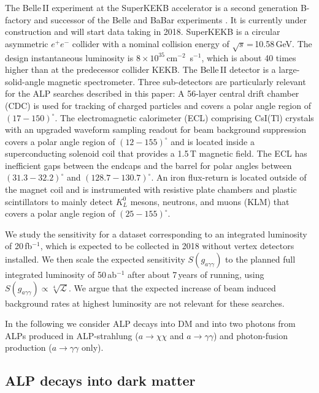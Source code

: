 \documentclass[11pt,a4paper]{article}
\newcommand{\ga}{g_{a\gamma\gamma}}
\def \belletwo {Belle\,II\xspace}
\def \belle {Belle\xspace}
\def \babar {BaBar\xspace}
\def \superkekb {SuperKEKB\xspace}
\begin{document}
The \belletwo experiment at the SuperKEKB accelerator is a second generation \hbox{B-factory} and successor of the \belle and \babar experiments \cite{Abe:2010gxa}. It is currently under construction and will start data taking in 2018. \superkekb is a circular asymmetric $e^+e^-$ collider with a nominal collision energy of $\sqrt{s}$\,=\,10.58\,GeV. The design instantaneous luminosity is \hbox{$8\times10^{35}$\,cm$^{-2}$ s$^{-1}$}, which is about 40 times higher than at the predecessor collider KEKB. The \belletwo detector is a large-solid-angle magnetic spectrometer. Three  sub-detectors are particularly relevant for the ALP searches described in this paper: A 56-layer central drift chamber (CDC) is used for tracking of charged particles and covers a polar angle region of $(17-150)^{\circ}$. The electromagnetic calorimeter (ECL) comprising CsI(Tl) crystals with an upgraded waveform sampling readout for beam background suppression covers a polar angle region of $(12-155)^{\circ}$ and is located inside a superconducting solenoid coil that provides a 1.5\,T magnetic field. The ECL has inefficient gaps between the endcaps and the barrel for polar angles between $(31.3-32.2)^{\circ}$ and $(128.7-130.7)^{\circ}$. An iron flux-return is located outside of the magnet coil and is instrumented with resistive plate chambers and plastic scintillators to mainly detect $K^0_L$ mesons, neutrons, and muons (KLM) that covers a polar angle region of $(25-155)^{\circ}$.

We study the sensitivity for a dataset corresponding to an integrated luminosity of 20\,fb$^{-1}$, which is expected to be collected in 2018 without vertex detectors installed. We then scale the expected sensitivity $S(\ga)$  to the planned full integrated luminosity of 50\,ab$^{-1}$ after about 7\,years of running, using $S(\ga) \propto \sqrt[4]{\mathcal{L}}$. We argue that the expected increase of beam induced background rates at highest luminosity are not relevant for these searches.

In the following we consider ALP decays into DM and into two photons from ALPs produced in ALP-strahlung ($a\to\chi \chi$ and $a\to\gamma\gamma$) and photon-fusion production ($a\to\gamma\gamma$ only). 

\subsection{ALP decays into dark matter}
\end{document}
